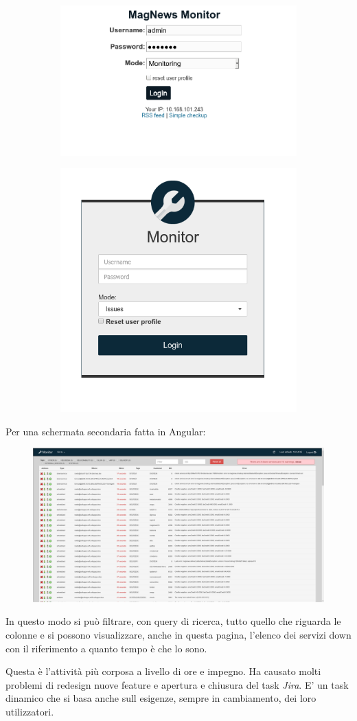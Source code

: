 \documentclass[a4paper]{article}
\begin{document}
\begin{figure}[H]
	\centering
	\begin{subfigure}
	  \centering
	  \includegraphics[width=0.45\linewidth]{login_old.png}
	\end{subfigure}%
	\begin{subfigure}
	  \centering
	  \includegraphics[width=0.45\linewidth]{login_new.png}
	\end{subfigure}
\end{figure}
Per una schermata secondaria fatta in Angular:
\begin{figure}[H]
	\includegraphics[width=\textwidth]{issue_new.png}
	\centering
\end{figure}
\par In questo modo si può filtrare, con query di ricerca, tutto quello che riguarda le colonne
e si possono visualizzare, anche in questa pagina, l'elenco dei servizi down con il 
riferimento a quanto tempo è che lo sono. 
\par Questa è l'attività più corposa a livello di ore e impegno. Ha causato molti problemi di 
redesign nuove feature e apertura e chiusura del task \emph{Jira}. E' un task dinamico
che si basa anche sull esigenze, sempre in cambiamento, dei loro utilizzatori.
\end{document}
